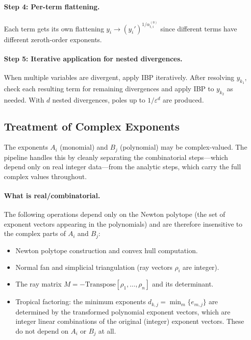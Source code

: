 \documentclass[11pt,a4paper]{article}
\begin{document}
\paragraph{Step 4: Per-term flattening.}
Each term gets its own flattening $y_i \to (y_i')^{1/\alpha_{t,i}^{(0)}}$ since different terms have different zeroth-order exponents.

\paragraph{Step 5: Iterative application for nested divergences.}
When multiple variables are divergent, apply IBP iteratively.  After resolving $y_{k_1}$, check each resulting term for remaining divergences and apply IBP to $y_{k_2}$ as needed.  With $d$ nested divergences, poles up to $1/\varepsilon^d$ are produced.

\subsection{Treatment of Complex Exponents}\label{sec:complex-exponents}

The exponents $A_i$ (monomial) and $B_j$ (polynomial) may be complex-valued.
The pipeline handles this by cleanly separating the combinatorial steps---which
depend only on real integer data---from the analytic steps, which carry the full
complex values throughout.

\paragraph{What is real/combinatorial.}
The following operations depend only on the Newton polytope (the set of
exponent vectors appearing in the polynomials) and are therefore insensitive
to the complex parts of $A_i$ and $B_j$:
\begin{itemize}
  \item Newton polytope construction and convex hull computation.
  \item Normal fan and simplicial triangulation (ray vectors $\rho_i$ are integer).
  \item The ray matrix $M = -\mathrm{Transpose}[\rho_1, \ldots, \rho_n]$ and its determinant.
  \item Tropical factoring: the minimum exponents $d_{k,j} = \min_m\{e_{m,j}\}$ are determined by the transformed polynomial exponent vectors, which are integer linear combinations of the original (integer) exponent vectors. These do not depend on $A_i$ or $B_j$ at all.
\end{itemize}
\end{document}
